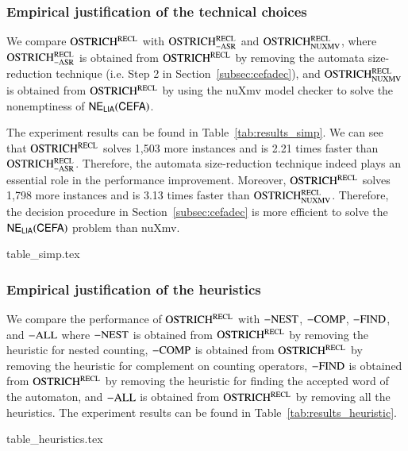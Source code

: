 \subsubsection{Empirical justification of the technical choices}
We compare $\rm OSTRICH^{RECL}$ with $\rm OSTRICH^{RECL}_{\rm -ASR}$ and $\rm OSTRICH^{RECL}_{\rm NUXMV}$, where $\rm OSTRICH^{RECL}_{\rm -ASR}$ is obtained from $\rm OSTRICH^{RECL}$ by removing the automata size-reduction technique (i.e. Step 2 in Section~\ref{subsec:cefadec}), and $\rm OSTRICH^{RECL}_{\rm NUXMV}$ is obtained from $\rm OSTRICH^{RECL}$ by using the nuXmv model checker to solve the nonemptiness of ${\sf NE_{LIA}(CEFA)}$.

The experiment results can be found in Table~\ref{tab:results_simp}. 
We can see that $\rm OSTRICH^{RECL}$ solves 1,503 more instances and is 2.21 times faster than $\rm OSTRICH^{RECL}_{\rm -ASR}$. Therefore, the automata size-reduction technique indeed plays an essential role in the performance improvement. 
Moreover, $\rm OSTRICH^{RECL}$ solves 1,798 more instances and is 3.13 times faster than $\rm OSTRICH^{RECL}_{\rm NUXMV}$. Therefore, the decision procedure in Section~\ref{subsec:cefadec} is more efficient to solve the ${\sf NE_{LIA}(CEFA)}$ problem than nuXmv. 
\begin{table}[H]
  {table_simp.tex}
  \caption{Empirical justification of the technical choices in the decision procedure}\label{tab:results_simp}
\end{table}

\subsubsection{Empirical justification of the heuristics} We compare the performance of $\rm OSTRICH^{RECL}$ with ${\rm -NEST}$, ${\rm -COMP}$, ${\rm -FIND}$, and ${\rm -ALL}$ where ${\rm -NEST}$ is obtained from $\rm OSTRICH^{RECL}$ by removing the heuristic for nested counting, ${\rm -COMP}$ is obtained from $\rm OSTRICH^{RECL}$ by removing the heuristic for complement on counting operators, ${\rm -FIND}$ is obtained from $\rm OSTRICH^{RECL}$ by removing the heuristic for finding the accepted word of the automaton, and ${\rm -ALL}$ is obtained from $\rm OSTRICH^{RECL}$ by removing all the heuristics.
The experiment results can be found in Table~\ref{tab:results_heuristic}. 

\begin{table}
  {table_heuristics.tex}
  \caption{Empirical justification of the heuristics}\label{tab:results_heuristic}
\end{table}

